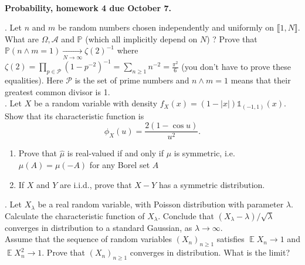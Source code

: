 \documentclass[11pt,reqno]{amsart}
\renewcommand{\P}{{\mathbb{P}}}
\DeclareMathOperator{\E}{\mathbb{E}}      %
\theoremstyle{definition}
\theoremstyle{remark}
\newcommand{\1}{\mathds{1}}
\numberwithin{equation}{section}
\begin{document}
~\vspace{-3cm}
\begin{center}
{\bf Probability, homework 4 due October 7.}
\end{center}
\vspace{1cm}
\small




.
Let $n$ and $m$ be random numbers chosen independently and uniformly on $\llbracket 1, N\rrbracket$.
What are $\Omega, \mathcal{A}$ and $\P$ (which all implicitly depend on $N$) ?
Prove that
$
\P(n\wedge m=1)\underset{N\to\infty}{\longrightarrow}\zeta(2)^{-1}
$
where $\zeta(2)=\prod_{p\in\mathcal{P}}(1-p^{-2})^{-1}=\sum_{n\geq 1}n^{-2}=\frac{\pi^2}{6}$ (you don't have to prove these equalities). Here $\mathcal{P}$ is the set of prime numbers and $n\wedge m=1$ means that their greatest common divisor is 1.\\


. Let $X$ be a random variable with density $f_X(x)=(1-|x|)\mathds{1}_{(-1,1)}(x)$. Show that its characteristic function is
$$
\phi_X(u)=\frac{2(1-\cos u)}{u^2}.
$$





\begin{enumerate}
\item Prove that $\hat \mu$ is real-valued if and only if $\mu$ is symmetric, i.e. $\mu(A)=\mu(-A)$ for any Borel set $A$\\
\item If $X$ and $Y$ are i.i.d., prove that $X-Y$ has a symmetric distribution.
\end{enumerate}



.
Let $X_\lambda$ be a real random variable, with Poisson distribution with parameter $\lambda$. Calculate the characteristic function of $X_\lambda$. Conclude that $(X_\lambda-\lambda)/\sqrt{\lambda}$ converges in distribution to a standard Gaussian, as $\lambda\to\infty$.\\



Assume that the sequence of random variables $(X_n)_{n\geq 1}$ satisfies
$
\E X_n\to 1
$
and $\E X_n^2\to 1$.
Prove that $(X_n)_{n\geq 1}$ converges in distribution. What is the limit?\\
\end{document}
